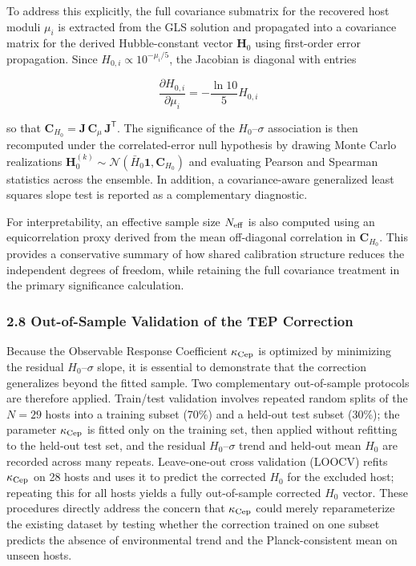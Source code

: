 \documentclass[
]{article}
\begin{document}
To address this explicitly, the full covariance submatrix for the
recovered host moduli \(\mu_i\) is extracted from the GLS solution and
propagated into a covariance matrix for the derived Hubble-constant
vector \(\mathbf{H}_0\) using first-order error propagation. Since
\(H_{0,i} \propto 10^{-\mu_i/5}\), the Jacobian is diagonal with entries

\begin{equation}
\frac{\partial H_{0,i}}{\partial \mu_i} = -\frac{\ln 10}{5} H_{0,i}
\end{equation}

so that \(\mathbf{C}_{H_0} =
\mathbf{J}\,\mathbf{C}_{\mu}\,\mathbf{J}^\mathsf{T}\). The significance
of the \(H_0\)--\(\sigma\) association is then recomputed under the
correlated-error null hypothesis by drawing Monte Carlo realizations
\(\mathbf{H}_0^{(k)} \sim
\mathcal{N}(\bar{H}_0\mathbf{1}, \mathbf{C}_{H_0})\) and evaluating
Pearson and Spearman statistics across the ensemble. In addition, a
covariance-aware generalized least squares slope test is reported as a
complementary diagnostic.

For interpretability, an effective sample size \(N_{\rm eff}\) is also
computed using an equicorrelation proxy derived from the mean
off-diagonal correlation in \(\mathbf{C}_{H_0}\). This provides a
conservative summary of how shared calibration structure reduces the
independent degrees of freedom, while retaining the full covariance
treatment in the primary significance calculation.

\subsubsection{2.8 Out-of-Sample Validation of the TEP
Correction}\label{out-of-sample-validation-of-the-tep-correction}

Because the Observable Response Coefficient \(\kappa_{\rm Cep}\) is
optimized by minimizing the residual \(H_0\)--\(\sigma\) slope, it is
essential to demonstrate that the correction generalizes beyond the
fitted sample. Two complementary out-of-sample protocols are therefore
applied. Train/test validation involves repeated random splits of the
\(N=29\) hosts into a training subset (70\%) and a held-out test subset
(30\%); the parameter \(\kappa_{\rm Cep}\) is fitted only on the
training set, then applied without refitting to the held-out test set,
and the residual \(H_0\)--\(\sigma\) trend and held-out mean \(H_0\) are
recorded across many repeats. Leave-one-out cross validation (LOOCV)
refits \(\kappa_{\rm Cep}\) on 28 hosts and uses it to predict the
corrected \(H_0\) for the excluded host; repeating this for all hosts
yields a fully out-of-sample corrected \(H_0\) vector. These procedures
directly address the concern that \(\kappa_{\rm Cep}\) could merely
reparameterize the existing dataset by testing whether the correction
trained on one subset predicts the absence of environmental trend and
the Planck-consistent mean on unseen hosts.
\end{document}
